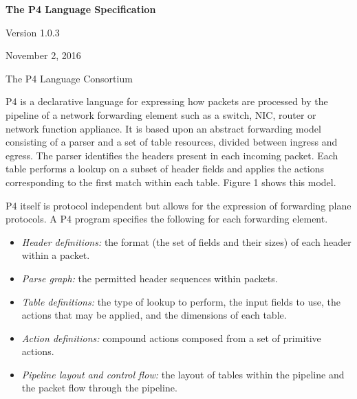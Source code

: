 \documentclass[12pt]{article}
\begin{document}
\vspace{2cm}

\centerline{\sffamily\bfseries\huge The P4 Language Specification}
\vspace{3mm}
\centerline{\sffamily\Large Version 1.0.3}
\vspace{3mm}
\centerline{\sffamily\large November 2, 2016}
\vspace{8mm}
\centerline{\sffamily\large The P4 Language Consortium}

\date{September 13, 2016}
\thispagestyle{firstpagestyle}


P4 is a declarative language for expressing how packets are processed by the 
pipeline of a network forwarding element such as a switch, NIC, router or 
network function appliance. It is based upon an abstract forwarding model 
consisting of a parser and a set of \matchaction table resources, divided 
between ingress and egress. The parser identifies the headers present in 
each incoming packet. Each \matchaction table performs a lookup on a subset 
of header fields and applies the actions corresponding to the first match 
within each table. Figure 1 shows this model.

P4 itself is protocol independent but allows for the expression of forwarding 
plane protocols. A P4 program specifies the following for each forwarding 
element.

\begin{itemize}
\item
\textit{Header definitions:} the format (the set of fields and their
sizes) of each header within a packet.
\item
\textit{Parse graph:} the permitted header sequences within packets.
\item
\textit{Table definitions:} the type of lookup to perform, the input
fields to use, the actions that may be applied, and the dimensions of
each table.
\item
\textit{Action definitions:} compound actions composed from a set of
primitive actions.
\item
\textit{Pipeline layout and control flow:} the layout of tables within
the pipeline and the packet flow through the pipeline.
\end{itemize}
\end{document}
